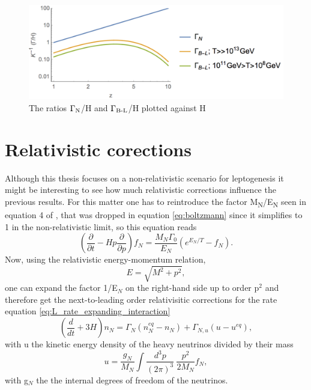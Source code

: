 \begin{figure}[H]
	\centering
	\includegraphics[width=0.8\linewidth]{Images/rates}
	\caption{The ratios $\Gamma\textsubscript{N}$/H and $\Gamma\textsubscript{B-L}$/H plotted against H}
	\label{fig:rates}
\end{figure}
\section{Relativistic corections}
Although this thesis focuses on a non-relativistic scenario for leptogenesis it might be interesting to see how much relativistic corrections influence the previous results. For this matter one has to reintroduce the factor M\textsubscript{N}/E\textsubscript{N} seen in equation 4 of \cite{Bodeker:2013qaa}, that was dropped in equation \eqref{eq:boltzmann} since it simplifies to 1 in the non-relativistic limit, so this equation reads
\begin{equation}
	\left(\frac{\partial}{\partial t}-Hp\frac{\partial}{\partial p}\right)f_N=\frac{M_N\Gamma_0}{E_N}\left(e^{E_N/T}-f_N\right).
	\label{eq:boltzmann_2}
\end{equation}
Now, using the relativistic energy-momentum relation,
\begin{equation}
	E=\sqrt{M^2+p^2},
	\label{eq:rel_energy_momentum}
\end{equation}
one can expand the factor 1/E$_N$ on the right-hand side up to order p$^2$ and therefore get the next-to-leading order relativisitic corrections for the rate equation \eqref{eq:L_rate_expanding_interaction}
\begin{equation}
\left(\frac{d}{dt}+3H\right)n_N=\Gamma_N\left(n_N^{eq}-n_N\right)+\Gamma_{N,u}\left(u-u^{eq}\right),
\label{eq:L_rate_expanding_interaction_rel}
\end{equation}
with u the kinetic energy density of the heavy neutrinos divided by their mass
\begin{equation}
	u=\frac{g_N}{M_N}\int\frac{d^3p}{(2\pi)^3}\:\frac{p^2}{2M_N}f_N,
	\label{eq:energy_density}
\end{equation}
with g$_N$ the the internal degrees of freedom of the neutrinos. \newline\indent
